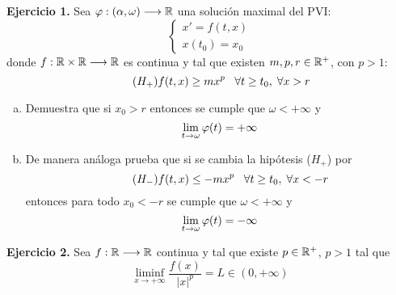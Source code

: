 \documentclass[12pt]{article}
\theoremstyle{definition}
\theoremstyle{remark}
\begin{document}
\textbf{Ejercicio 1.} Sea $\varphi : (\alpha,\omega) \longrightarrow \mathbb{R}$ una solución maximal del PVI:
\[
\left\{
\begin{array}{l}
x'=f(t,x)\\
x(t_0)=x_0
\end{array}
\right.
\]
donde $f : \mathbb{R}\times\mathbb{R} \longrightarrow \mathbb{R}$ es continua y tal que existen $m,p,r\in\mathbb{R}^+$, con $p>1$:
\begin{equation}
\tag{$H_+$}
f(t,x)\geq mx^p \;\;\; \forall t\geq t_0, \; \forall x > r
\end{equation}
\begin{enumerate}[(a)]
\item Demuestra que si $x_0>r$ entonces se cumple que $\omega < +\infty$ y 
\[
\displaystyle\lim_{ t \to \omega } \varphi(t)=+\infty
\]

\item De manera análoga prueba que si se cambia la hipótesis ($H_+$) por
\begin{equation}
\tag{$H_-$}
f(t,x)\leq -mx^p \;\;\; \forall t\geq t_0, \; \forall x < -r
\end{equation}
entonces para todo $x_0<-r$ se cumple que $\omega<+\infty$ y
\[
\displaystyle\lim_{ t \to \omega } \varphi(t)=-\infty
\]
\end{enumerate}

\textbf{Ejercicio 2.} Sea $f : \mathbb{R} \longrightarrow \mathbb{R}$ continua y tal que existe $p\in\mathbb{R}^+$, $p>1$ tal que 
\[
\liminf_{x\to+\infty}\frac{f(x)}{|x|^p}=L\in(0,+\infty)
\]
\end{document}
